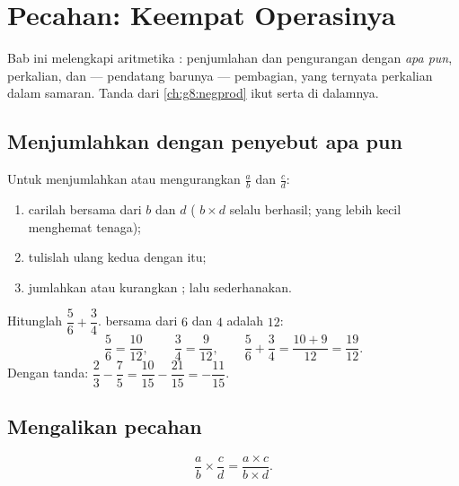 \chapter{Pecahan: Keempat Operasinya}\label{ch:g8:fractions}

Bab ini melengkapi aritmetika : penjumlahan dan pengurangan
dengan  \emph{apa pun}, perkalian, dan --- pendatang barunya
--- pembagian, yang ternyata perkalian dalam samaran. Tanda dari
\cref{ch:g8:negprod} ikut serta di dalamnya.

\section{Menjumlahkan dengan penyebut apa pun}

\begin{method}\label{met:g8:fractions:add}
Untuk menjumlahkan atau mengurangkan $\frac ab$ dan $\frac cd$:
\begin{enumerate}
  \item carilah  bersama dari $b$ dan $d$ (
        $b \times d$ selalu berhasil; yang lebih kecil menghemat
        tenaga);
  \item tulislah ulang kedua  dengan  itu;
  \item jumlahkan atau kurangkan ; lalu sederhanakan.
\end{enumerate}
\end{method}

\begin{example}\label{ex:g8:fractions:add}
Hitunglah $\dfrac{5}{6} + \dfrac{3}{4}$.  bersama dari $6$
dan $4$ adalah $12$:
\[
\frac{5}{6} = \frac{10}{12},
\qquad
\frac{3}{4} = \frac{9}{12},
\qquad
\frac{5}{6} + \frac{3}{4} = \frac{10 + 9}{12} = \frac{19}{12}.
\]
Dengan tanda: $\dfrac{2}{3} - \dfrac{7}{5} = \dfrac{10}{15} -
\dfrac{21}{15} = -\dfrac{11}{15}$.
\end{example}

\section{Mengalikan pecahan}

\begin{theorem}\label{thm:g8:fractions:mult}
\[
\frac{a}{b} \times \frac{c}{d} = \frac{a \times c}{b \times d} .
\]
\end{theorem}


